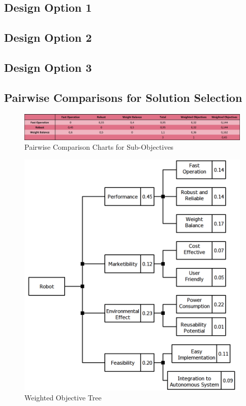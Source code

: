 \documentclass[a4paper,12pt]{article}
\begin{document}
	\subsection{Design Option 1}
	
	\subsection{Design Option 2}
	
	\subsection{Design Option 3}
	
	
	\subsection{Pairwise Comparisons for Solution Selection}	
	
	\begin{figure}[H]
		\centering
		\includegraphics[width=\textwidth,height=\textheight,keepaspectratio]{images/proje_objective_tree_2} 
		\caption{\label{fig:sub_project_objective_tree}Pairwise Comparison Charts for Sub-Objectives}
	\end{figure}	
	
	\begin{figure}[H]
		\centering
		\includegraphics[width=\textwidth,height=\textheight,keepaspectratio]{objective-tree/objective-tree} 
		\caption{\label{fig:product_tree}Weighted Objective Tree}
	\end{figure}
	
\end{document}
